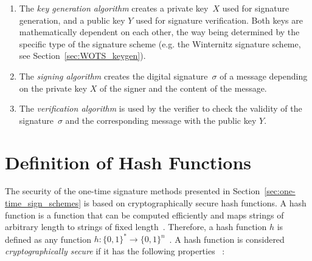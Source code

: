 \begin{enumerate}
\item The \textit{key generation algorithm} creates a private key~$X$ used for signature generation, and a public key $Y$ used for signature verification.
Both keys are mathematically dependent on each other, the way being determined by the specific type of the signature scheme (e.g. the Winternitz signature scheme, see Section~\ref{sec:WOTS_keygen}).

\item The \textit{signing algorithm} creates the digital signature~$\sigma$ of a message depending on the private key $X$ of the signer and the content of the message.
\item The \textit{verification algorithm} is used by the verifier to check the validity of the signature~$\sigma$ and the corresponding message with the public key $Y$.
\end{enumerate}



\section{Definition of Hash Functions} 
\label{sec:def_hashfunctions}
The security of the one-time signature methods presented in Section~\ref{sec:one-time_sign_schemes} is based on cryptographically secure hash functions. 
A hash function is a function that can be computed efficiently and maps strings of arbitrary length to strings of fixed length~\cite{cha:bg_hashfunctions_thesis_matusiewicz2007}. 
Therefore, a hash function $h$ is defined as any function $h: \{0,1\}^* \rightarrow \{0,1\}^n$~\cite{cha:bg_hashfunctoins_Stinson2006}. 
A hash function is considered \textit{cryptographically secure} if it has the following properties ~\cite{cha:bg_hashfunctions_BASIC_DEFINITIONS_Springer2004}: 


